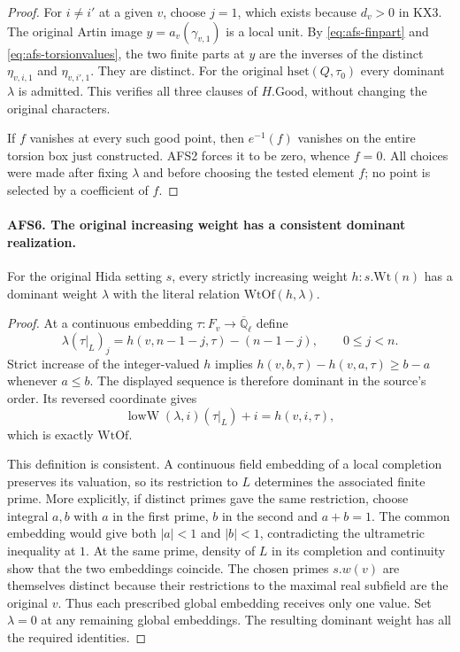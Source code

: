 \documentclass[11pt,a4paper]{article}
\numberwithin{equation}{section}
\theoremstyle{remark}\newtheorem{remark}[theorem]{Remark}
\begin{document}
\begin{proof}
For $i\ne i'$ at a given $v$, choose $j=1$, which exists
because $d_v>0$ in KX3.  The original Artin image
$y=a_v(\gamma_{v,1})$ is a local unit.  By
\eqref{eq:afs-finpart} and \eqref{eq:afs-torsionvalues}, the
two finite parts at $y$ are the inverses of the distinct
$\eta_{v,i,1}$ and $\eta_{v,i',1}$.  They are distinct.
For the original $\mathrm{hset}(Q,\tau_0)$ every dominant
$\lambda$ is admitted.  This verifies all three clauses of
$H.\mathrm{Good}$, without changing the original characters.

If $f$ vanishes at every such good point, then $e^{-1}(f)$
vanishes on the entire torsion box just constructed.  AFS2
forces it to be zero, whence $f=0$.  All choices were made
after fixing $\lambda$ and before choosing the tested element
$f$; no point is selected by a coefficient of $f$.
\end{proof}

\paragraph{AFS6. The original increasing weight has a consistent dominant realization.}
\label{claim:AFS6}
For the original Hida setting $s$, every strictly increasing
weight $h:s.\mathrm{Wt}(n)$ has a dominant weight $\lambda$
with the literal relation $\mathrm{WtOf}(h,\lambda)$.
\begin{proof}
At a continuous embedding $\tau:F_v\to\overline{\mathbb Q}_\ell$
define
\[
 \lambda(\tau|_L)_j=h(v,n-1-j,\tau)-(n-1-j),
                      \qquad 0\leq j<n.
\]
Strict increase of the integer-valued $h$ implies
$h(v,b,\tau)-h(v,a,\tau)\geq b-a$ whenever $a\leq b$.
The displayed sequence is therefore dominant in the source's
order.  Its reversed coordinate gives
\[
 \operatorname{lowW}(\lambda,i)(\tau|_L)+i=h(v,i,\tau),
\]
which is exactly $\mathrm{WtOf}$.

This definition is consistent.  A continuous field embedding
of a local completion preserves its valuation, so its
restriction to $L$ determines the associated finite prime.
More explicitly, if distinct primes gave the same restriction,
choose integral $a,b$ with $a$ in the first prime, $b$ in the
second and $a+b=1$.  The common embedding would give both
$|a|<1$ and $|b|<1$, contradicting the ultrametric inequality
at $1$.  At the same prime, density of $L$ in its completion
and continuity show that the two embeddings coincide.  The
chosen primes $s.w(v)$ are themselves distinct because their
restrictions to the maximal real subfield are the original
$v$.  Thus each prescribed global embedding receives only
one value.  Set $\lambda=0$ at any remaining global embeddings.
The resulting dominant weight has all the required identities.
\end{proof}
\end{document}
